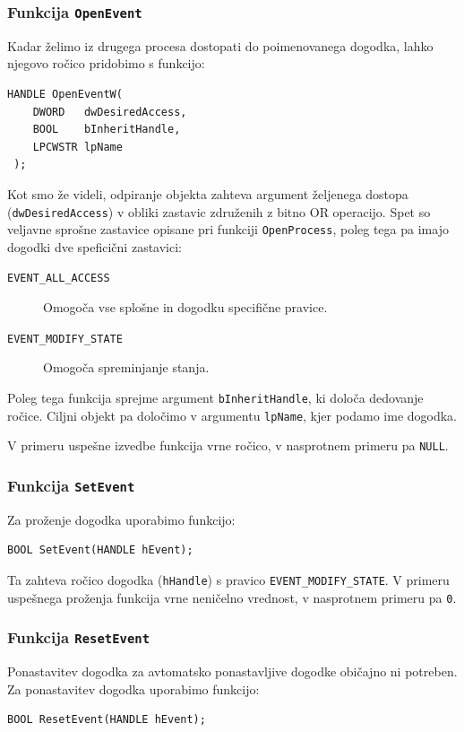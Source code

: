 \documentclass[a4paper,12pt,openright]{book}
\begin{document}
\subsubsection{Funkcija \texttt{OpenEvent}}

Kadar želimo iz drugega procesa dostopati do poimenovanega dogodka, lahko njegovo ročico pridobimo s funkcijo:
\begin{lstlisting}[style=func]
 HANDLE OpenEventW(
	DWORD   dwDesiredAccess,
	BOOL    bInheritHandle,
	LPCWSTR lpName
 );
\end{lstlisting}

Kot smo že videli, odpiranje objekta zahteva argument željenega dostopa (\texttt{dwDesiredAccess}) v obliki zastavic združenih z bitno OR operacijo.
Spet so veljavne sprošne zastavice opisane pri funkciji \texttt{OpenProcess}, poleg tega pa imajo dogodki dve speficični zastavici:
\begin{description}
	\item[\texttt{EVENT\_ALL\_ACCESS}] Omogoča vse splošne in dogodku specifične pravice.
	\item[\texttt{EVENT\_MODIFY\_STATE}] Omogoča spreminjanje stanja.
\end{description}

Poleg tega funkcija sprejme argument \texttt{bInheritHandle}, ki določa dedovanje ročice.
Ciljni objekt pa določimo v argumentu \texttt{lpName}, kjer podamo ime dogodka.

V primeru uspešne izvedbe funkcija vrne ročico, v nasprotnem primeru pa \texttt{NULL}.

\subsubsection{Funkcija \texttt{SetEvent}}

Za proženje dogodka uporabimo funkcijo:
\begin{lstlisting}[style=func]
 BOOL SetEvent(HANDLE hEvent);
\end{lstlisting}

Ta zahteva ročico dogodka (\texttt{hHandle}) s pravico \texttt{EVENT\-\_MODIFY\_STATE}.
V primeru uspešnega proženja funkcija vrne neničelno vrednost, v nasprotnem primeru pa \texttt{0}.

\subsubsection{Funkcija \texttt{ResetEvent}}

Ponastavitev dogodka za avtomatsko ponastavljive dogodke običajno ni potreben.
Za ponastavitev dogodka uporabimo funkcijo:
\begin{lstlisting}[style=func]
 BOOL ResetEvent(HANDLE hEvent);
\end{lstlisting}
\end{document}
